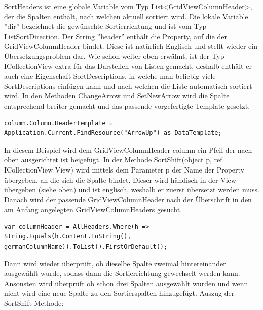 SortHeaders ist eine globale Variable vom Typ List\textless GridViewColumnHeader\textgreater , der die Spalten enthält, nach welchen aktuell sortiert wird. Die lokale Variable ''dir'' bezeichnet die gewünschte Sortierrichtung und ist vom Typ ListSortDirection. Der String ''header'' enthält die Property, auf die der GridViewColumnHeader bindet. Diese ist natürlich Englisch und stellt wieder ein Übersetzungsproblem dar. \newline Wie schon weiter oben erwähnt, ist der Typ ICollectionView extra für das Darstellen von Listen gemacht, deshalb enthält er auch eine Eigenschaft SortDescriptions, in welche man beliebig viele SortDescriptions einfügen kann und nach welchen die Liste automatisch sortiert wird. In den Methoden ChangeArrow und SetNewArrow wird die Spalte entsprechend breiter gemacht und das passende vorgefertigte Template gesetzt.
\begin{lstlisting}
column.Column.HeaderTemplate = Application.Current.FindResource("ArrowUp") as DataTemplate;
\end{lstlisting}
In diesem Beispiel wird dem GridViewColumnHeader column ein Pfeil der nach oben ausgerichtet ist beigefügt.
In der Methode SortShift(object p, ref ICollectionView View) wird mittels dem Parameter p der Name der Property übergeben, an die sich die Spalte bindet. Dieser wird händisch in der View übergeben (siehe oben) und ist englisch, weshalb er zuerst übersetzt werden muss. Danach wird der passende GridViewColumnHeader nach der Überschrift in den am Anfang angelegten GridViewColumnHeaders gesucht.

\begin{lstlisting}
var columnHeader = AllHeaders.Where(h => String.Equals(h.Content.ToString(), germanColumnName)).ToList().FirstOrDefault();
\end{lstlisting}
Dann wird wieder überprüft, ob dieselbe Spalte zweimal hintereinander ausgewählt wurde, sodass dann die Sortierrichtung gewechselt werden kann. Ansonsten wird überprüft ob schon drei Spalten ausgewählt wurden und wenn nicht wird eine neue Spalte zu den Sortierspalten hinzugefügt.
Auszug der SortShift-Methode:

